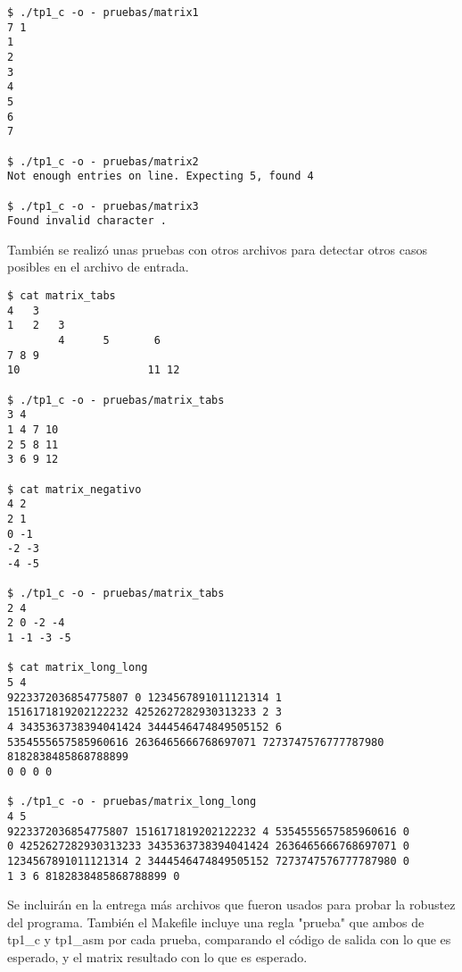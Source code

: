 \documentclass[a4paper]{article}
\begin{document}
\begin{verbatim}
$ ./tp1_c -o - pruebas/matrix1
7 1
1
2
3
4
5
6
7

$ ./tp1_c -o - pruebas/matrix2
Not enough entries on line. Expecting 5, found 4

$ ./tp1_c -o - pruebas/matrix3
Found invalid character .

\end{verbatim}

También se realizó unas pruebas con otros archivos para detectar otros casos posibles en el archivo de entrada.

\begin{verbatim}
$ cat matrix_tabs
4   3
1   2   3
		4	   5	   6
7 8 9
10					  11 12

$ ./tp1_c -o - pruebas/matrix_tabs
3 4
1 4 7 10
2 5 8 11
3 6 9 12

$ cat matrix_negativo
4 2
2 1
0 -1
-2 -3
-4 -5

$ ./tp1_c -o - pruebas/matrix_tabs
2 4
2 0 -2 -4
1 -1 -3 -5

$ cat matrix_long_long
5 4
9223372036854775807 0 1234567891011121314 1
1516171819202122232 4252627282930313233 2 3
4 3435363738394041424 3444546474849505152 6
5354555657585960616 2636465666768697071 7273747576777787980 8182838485868788899
0 0 0 0

$ ./tp1_c -o - pruebas/matrix_long_long
4 5
9223372036854775807 1516171819202122232 4 5354555657585960616 0
0 4252627282930313233 3435363738394041424 2636465666768697071 0
1234567891011121314 2 3444546474849505152 7273747576777787980 0
1 3 6 8182838485868788899 0
\end{verbatim}

Se incluirán en la entrega más archivos que fueron usados para probar la robustez del programa. También el Makefile incluye una regla "prueba" que ambos de tp1\_c y tp1\_asm por cada prueba, comparando el código de salida con lo que es esperado, y el matrix resultado con lo que es esperado.
\end{document}
